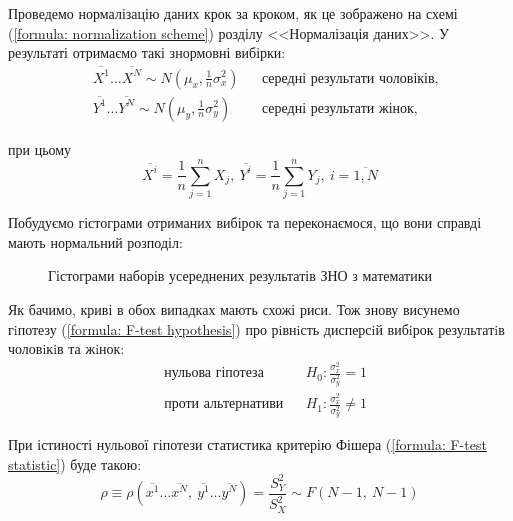 Проведемо нормалізацію даних крок за кроком, як це зображено на схемі (\ref{formula: normalization scheme}) 
розділу <<Нормалізація даних>>. У результаті отримаємо такі знормовні вибірки:
\begin{align*}
    &\overline{X^1}\ldots \overline{X^N}\sim N(\mu_x,\tfrac{1}{n}\sigma_x^2) && \text{середні результати чоловіків,} \\
    &\overline{Y^1}\ldots \overline{Y^N}\sim N(\mu_y,\tfrac{1}{n}\sigma_y^2) && \text{середні результати жінок,}
\end{align*}

при цьому
\[ \overline{X^i}=\frac{1}{n}\sum\limits_{j=1}^nX_j,\ 
   \overline{Y^i}=\frac{1}{n}\sum\limits_{j=1}^nY_j,\ i=\overline{1,N} \]

Побудуємо гістограми отриманих вибірок та переконаємося, що вони справді мають нормальний розподіл:

\begin{figure}[H]
    \caption{Гістограми наборів усереднених результатів ЗНО з математики}
    \label{figure: MATH means data}
\end{figure}

Як бачимо, криві в обох випадках мають схожі риси. Тож знову висунемо гiпотезу (\ref{formula: F-test hypothesis}) 
про рiвнiсть дисперсiй вибiрок результатiв чоловiкiв та жiнок:
\begin{align*}
    &\text{нульова гіпотеза} && H_0: \frac{\sigma_x^2}{\sigma_y^2}=1 \\
    &\text{проти альтернативи} && H_1: \frac{\sigma_x^2}{\sigma_y^2}\neq 1 \nonumber
\end{align*}

При істиності нульової гіпотези статистика критерію Фішера (\ref{formula: F-test statistic}) буде такою:
\begin{equation*}
    \rho\equiv
    \rho(\overline{ x^1}\ldots \overline{x^N},\ \overline{y^1}\ldots \overline{y^N})=\frac{S_Y^2}{S_X^2}
    \sim F\left( N-1,\ N-1 \right)
\end{equation*}

